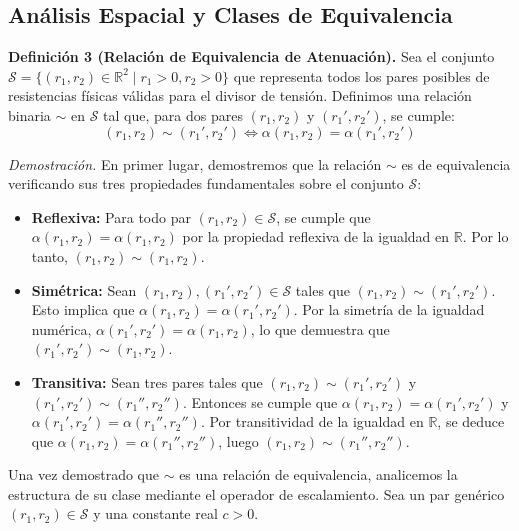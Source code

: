 \documentclass[11pt, a4paper]{article}
\theoremstyle{definition}
\theoremstyle{plain}
\theoremstyle{plain}
\theoremstyle{remark}
\theoremstyle{remark}
\theoremstyle{remark}
\begin{document}
\subsection*{Análisis Espacial y Clases de Equivalencia}

\textbf{Definición 3 (Relación de Equivalencia de Atenuación).} 
Sea el conjunto $\mathcal{S} = \{(r_1, r_2) \in \mathbb{R}^2 \mid r_1 > 0, r_2 > 0\}$ que representa todos los pares posibles de resistencias físicas válidas para el divisor de tensión. Definimos una relación binaria $\sim$ en $\mathcal{S}$ tal que, para dos pares $(r_1, r_2)$ y $(r_1', r_2')$, se cumple:
\begin{equation}
	(r_1, r_2) \sim (r_1', r_2') \iff \alpha(r_1, r_2) = \alpha(r_1', r_2')
\end{equation}

\textit{Demostración.} 
En primer lugar, demostremos que la relación $\sim$ es de equivalencia verificando sus tres propiedades fundamentales sobre el conjunto $\mathcal{S}$:
\begin{itemize}
	\item \textbf{Reflexiva:} Para todo par $(r_1, r_2) \in \mathcal{S}$, se cumple que $\alpha(r_1, r_2) = \alpha(r_1, r_2)$ por la propiedad reflexiva de la igualdad en $\mathbb{R}$. Por lo tanto, $(r_1, r_2) \sim (r_1, r_2)$.
	
	\item \textbf{Simétrica:} Sean $(r_1, r_2), (r_1', r_2') \in \mathcal{S}$ tales que $(r_1, r_2) \sim (r_1', r_2')$. Esto implica que $\alpha(r_1, r_2) = \alpha(r_1', r_2')$. Por la simetría de la igualdad numérica, $\alpha(r_1', r_2') = \alpha(r_1, r_2)$, lo que demuestra que $(r_1', r_2') \sim (r_1, r_2)$.
	
	\item \textbf{Transitiva:} Sean tres pares tales que $(r_1, r_2) \sim (r_1', r_2')$ y $(r_1', r_2') \sim (r_1'', r_2'')$. Entonces se cumple que $\alpha(r_1, r_2) = \alpha(r_1', r_2')$ y $\alpha(r_1', r_2') = \alpha(r_1'', r_2'')$. Por transitividad de la igualdad en $\mathbb{R}$, se deduce que $\alpha(r_1, r_2) = \alpha(r_1'', r_2'')$, luego $(r_1, r_2) \sim (r_1'', r_2'')$.
\end{itemize}





Una vez demostrado que $\sim$ es una relación de equivalencia, analicemos la estructura de su clase mediante el operador de escalamiento. Sea un par genérico $(r_1, r_2) \in \mathcal{S}$ y una constante real $c > 0$. 
\end{document}
